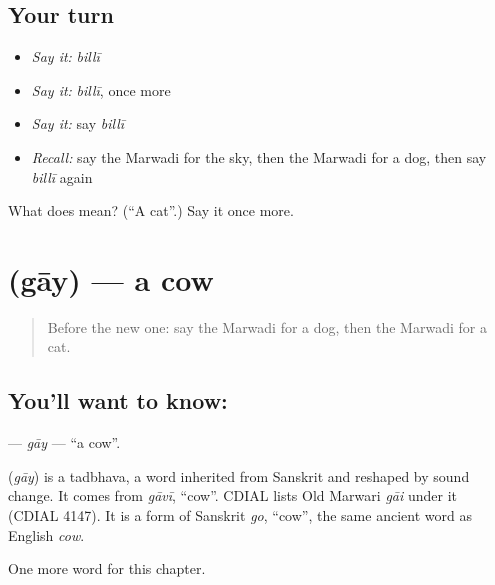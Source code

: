 \subsection*{Your turn}
\begin{itemize}
\raggedright
  \item \emph{Say it:} \emph{billī}
  \item \emph{Say it:} \emph{billī}, once more
  \item \emph{Say it:} say \emph{billī}
  \item \emph{Recall:} say the Marwadi for the sky, then the Marwadi for a dog, then say \emph{billī} again
\end{itemize}

\begin{tcolorbox}[breakable,colback=teal!4,colframe=teal!35!black,title={Before you move on}]
What does  mean? (\textquotedblleft{}A cat\textquotedblright{}.) Say it once more.
\end{tcolorbox}
\section[\texorpdfstring{\mw{गाय} (gāy)}{गाय (gāy)}]{ (gāy) — a cow}

\label{lesson:MW-C70-gay}



\begin{quote}
Before the new one: say the Marwadi for a dog, then the Marwadi for a cat.
\end{quote}

\subsection*{You'll want to know: }
\textbf{} — \emph{gāy} — \textquotedblleft{}a cow\textquotedblright{}.

\begin{cousinweb}
\textbf{} (\emph{gāy}) is a tadbhava, a word inherited from Sanskrit and reshaped by sound change. It comes from \emph{gāvī}, \textquotedblleft{}cow\textquotedblright{}. CDIAL lists Old Marwari \emph{gāi} under it (CDIAL 4147). It is a form of Sanskrit \emph{go}, \textquotedblleft{}cow\textquotedblright{}, the same ancient word as English \emph{cow}.
\end{cousinweb}

\begin{grammarlens}[title={What you've built}]
One more word for this chapter.
\end{grammarlens}

